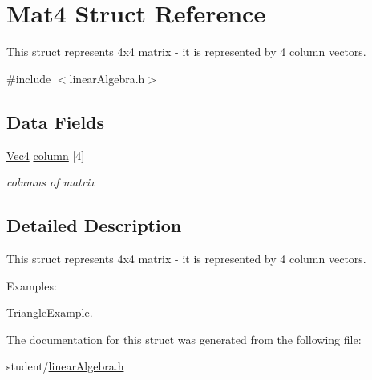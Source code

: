 \hypertarget{structMat4}{\section{Mat4 Struct Reference}
\label{structMat4}
}


This struct represents 4x4 matrix -\/ it is represented by 4 column vectors.  




{\ttfamily \#include $<$linear\-Algebra.\-h$>$}

\subsection*{Data Fields}
\begin{DoxyCompactItemize}
\item 
\hypertarget{structMat4_a89c6922a5ca3584062e9841090709592}{\hyperlink{structVec4}{Vec4} \hyperlink{structMat4_a89c6922a5ca3584062e9841090709592}{column} \mbox{[}4\mbox{]}}\label{structMat4_a89c6922a5ca3584062e9841090709592}

\begin{DoxyCompactList}\small\item\em columns of matrix \end{DoxyCompactList}\end{DoxyCompactItemize}


\subsection{Detailed Description}
This struct represents 4x4 matrix -\/ it is represented by 4 column vectors. \begin{Desc}
\item[Examples\-: ]\par
\hyperlink{TriangleExample-example}{Triangle\-Example}.\end{Desc}


The documentation for this struct was generated from the following file\-:\begin{DoxyCompactItemize}
\item 
student/\hyperlink{linearAlgebra_8h}{linear\-Algebra.\-h}\end{DoxyCompactItemize}
